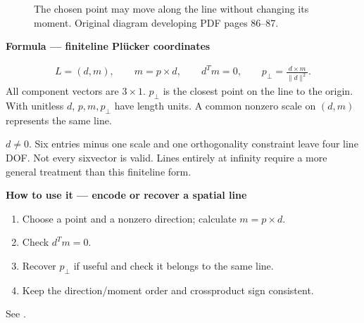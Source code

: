 \documentclass[letterpaper,11pt,english,openany,oneside]{jupyterBook}
\begin{document}
\begin{figure}[H]
\centering
\capstart

\noindent{}
\caption{The chosen point may move along the line without changing its moment. Original diagram developing PDF pages 86–87.}\label{\detokenize{lectures/lecture01/planes-lines:fig-lec01-plucker}}\end{figure}

\begin{TextbookBox}
\textbf{Formula — finite\sphinxhyphen{}line Plücker coordinates}\par\smallskip
\begin{equation}\label{equation:lectures/lecture01/planes-lines:eq-lec01-plucker}
\begin{split}L=(d,m),\qquad m=p\times d,\qquad d^Tm=0,\qquad
p_\perp=\frac{d\times m}{\|d\|^2}.\end{split}
\end{equation}
\sphinxAtStartPar
All component vectors are \(3\times1\). \(p_\perp\) is the closest point on the line to the origin. With unitless \(d\), \(p,m,p_\perp\) have length units. A common nonzero scale on \((d,m)\) represents the same line.

\sphinxAtStartPar
{} \(d\ne0\). Six entries minus one scale and one orthogonality constraint leave four line DOF. Not every six\sphinxhyphen{}vector is valid. Lines entirely at infinity require a more general treatment than this finite\sphinxhyphen{}line form.

\end{TextbookBox}

\begin{TextbookBox}
\textbf{How to use it — encode or recover a spatial line}\par\smallskip
\begin{enumerate}
%
\item {}
\sphinxAtStartPar
Choose a point and a nonzero direction; calculate \(m=p\times d\).

\item {}
\sphinxAtStartPar
Check \(d^Tm=0\).

\item {}
\sphinxAtStartPar
Recover \(p_\perp\) if useful and check it belongs to the same line.

\item {}
\sphinxAtStartPar
Keep the direction/moment order and cross\sphinxhyphen{}product sign consistent.

\end{enumerate}

\sphinxAtStartPar
See {\hyperref[\detokenize{lectures/lecture01/planes-lines:ex-lec01-plucker}]{}}.

\end{TextbookBox}
\end{document}
